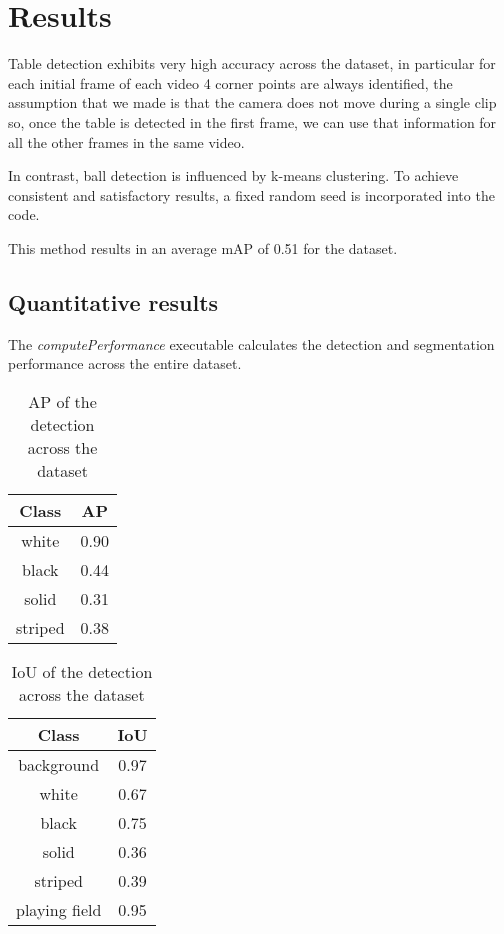 \section{Results}
Table detection exhibits very high accuracy across the dataset, in particular for each initial frame of each video 4 corner points are always identified, the assumption that we made is that the camera does not move during a single clip so, once the table is detected in the first frame, we can use that information for all the other frames in the same video.

In contrast, ball detection is influenced by k-means clustering. To achieve consistent and satisfactory results, a fixed random seed is incorporated into the code. %

This method results in an average mAP of 0.51 for the dataset.	%


\subsection{Quantitative results}
The \textit{computePerformance} executable calculates the detection and segmentation performance across the entire dataset.
\begin{table}[H]
	\centering
	\begin{tabular}{|c|c|}
		\hline
		\textbf{Class} & \textbf{AP} \\
		\hline
		white & 0.90 \\
		\hline
		black & 0.44 \\
		\hline
		solid & 0.31 \\
		\hline
		striped & 0.38 \\
		\hline
	\end{tabular}
	\caption{AP of the detection across the dataset}
	\label{tab: AP across dataset}
\end{table}

\begin{table}[H]
	\centering
	\begin{tabular}{|c|c|}
		\hline
		\textbf{Class} & \textbf{IoU} \\
		\hline
		background & 0.97 \\
		\hline
		white & 0.67 \\
		\hline
		black & 0.75 \\
		\hline
		solid & 0.36 \\
		\hline
		striped & 0.39 \\
		\hline
		playing field & 0.95 \\
		\hline
	\end{tabular}
	\caption{IoU of the detection across the dataset}
	\label{tab: IoU across dataset}
\end{table}

